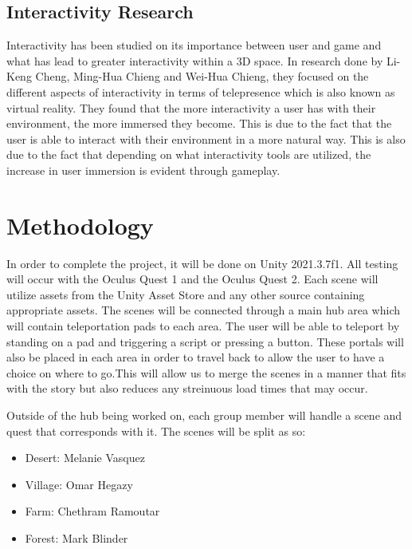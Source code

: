 \documentclass{vgtc}                          %
\begin{document}
\subsection*{Interactivity Research}
Interactivity has been studied on its importance between user and game and what has lead to greater interactivity within a 3D space. In research done by Li-Keng Cheng, Ming-Hua Chieng and Wei-Hua Chieng\cite{cheng_2014}, they focused on the different aspects of interactivity in terms of telepresence which is also known as virtual
reality. They found that the more interactivity a user has with their environment, the more immersed they become. This is due to the fact that the user is able to interact with their environment in a more natural way. This is also due to the fact that depending on what interactivity tools are utilized, the increase in user immersion
is evident through gameplay. 

\section{Methodology}
In order to complete the project, it will be done on Unity 2021.3.7f1. All testing will occur with the Oculus Quest 1 and the Oculus Quest 2. Each scene will utilize assets from the Unity Asset Store and any other
source containing appropriate assets. The scenes will be connected through a main hub area which will contain teleportation pads to each area. The user will be able to teleport by standing on a pad and triggering
a script or pressing a button. These portals will also be placed in each area
in order to travel back to allow the user to have a choice on where to go.This will allow us to merge the scenes in a manner that fits with the story but also reduces any streinuous load times that may
occur.

Outside of the hub being worked on, each group member will handle a scene and quest that corresponds with it. The scenes will be split as so:
\begin{itemize}
  \item Desert: Melanie Vasquez
  \item Village: Omar Hegazy
  \item Farm: Chethram Ramoutar
  \item Forest: Mark Blinder
\end{itemize}
\end{document}

